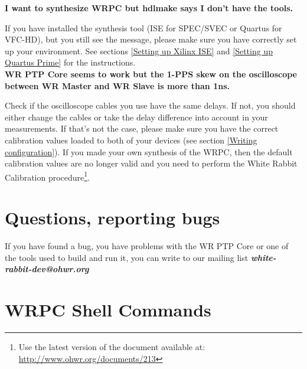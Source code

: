 \documentclass[a4paper, 12pt]{article}
\renewcommand{\_}{\underscore\allowbreak}
\begin{document}
\noindent \textbf{I want to synthesize WRPC but hdlmake says I don't have the
tools.}

If you have installed the synthesis tool (ISE for SPEC/SVEC or Quartus for
VFC-HD), but you still see the message, please make sure you have correctly set
up your environment. See sections \ref{Setting up Xilinx ISE} and \ref{Setting
up Quartus Prime} for the instructions.\\

\noindent \textbf{WR PTP Core seems to work but the 1-PPS skew on the
oscilloscope between WR Master and WR Slave is more than 1ns.}

Check if the oscilloscope cables you use have the same delays. If not, you
should either change the cables or take the delay difference into account in your
measurements. If that's not the case, please make sure you have the correct
calibration values loaded to both of your devices (see section \ref{Writing
configuration}). If you made your own synthesis of the WRPC, then the default
calibration values are no longer valid and you need to perform the White Rabbit
Calibration procedure\footnote{Use the latest version of the document available
at: \url{http://www.ohwr.org/documents/213}}.

\section{Questions, reporting bugs}
\label{Questions}

If you have found a bug, you have problems with the WR PTP Core or one of the
tools used to build and run it, you can write to our mailing list
\textbf{\textit{white-rabbit-dev@ohwr.org}}




\appendix
\clearpage
\section{WRPC Shell Commands}
\label{WRPC Shell commands}
\end{document}
